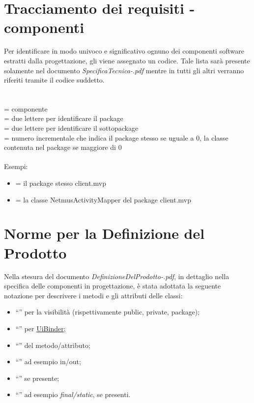 \newpage
\section{Tracciamento dei requisiti - componenti}
Per identificare in modo univoco e significativo ognuno dei componenti software
estratti dalla progettazione, gli viene assegnato un codice.
Tale lista sar\`a presente solamente nel documento
\emph{SpecificaTecnica-\versioneST.pdf} mentre in tutti gli altri verranno
riferiti tramite il codice suddetto.
\\
\\
\\
 = componente\\
 = due lettere per identificare il package\\
 = due lettere per identificare il sottopackage\\
 = numero incrementale che indica il package stesso se uguale a 0, la
classe contenuta nel package se maggiore di 0\\ \\
Esempi:
\begin{itemize}
  \item {} = il package stesso client.mvp
  \item {} = la classe NetmusActivityMapper del package client.mvp
\end{itemize}

\section{Norme per la Definizione del Prodotto}
Nella stesura del documento \emph{DefinizioneDelProdotto-\versioneDP.pdf}, in
dettaglio nella specifica delle componenti in progettazione, \`e stata adottata
la seguente notazione per descrivere i metodi e gli attributi delle classi:
\begin{itemize}
  \item ``\bo{+, -, \#}'' per la visibilit\`a (rispettivamente public, private,
  package);
  \item ``'' per \underline{UiBinder};
  \item ``'' del metodo/attributo;
  \item ``'' ad esempio in/out;
  \item ``'' se presente;
  \item ``'' ad esempio \emph{final/static}, se presenti.
\end{itemize}


